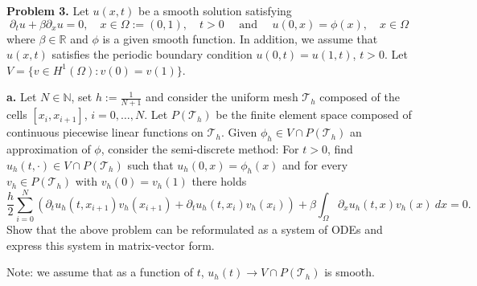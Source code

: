 \documentclass[11pt]{article}
\begin{document}
\vskip 2cm




\textbf{Problem 3.} Let $u(x,t)$ be a smooth solution satisfying
\begin{equation}
    \partial_t u + \beta \partial_x u = 0, \quad x \in \Omega := (0,1), \quad t > 0 \quad \text{ and } \quad u(0,x) = \phi(x), \quad x\in \Omega
\end{equation}
where $\beta \in \mathbb{R}$ and $\phi$ is a given smooth function.
In addition, we assume that $u(x,t)$ satisfies the periodic boundary condition $u(0,t) = u(1,t)$, $t > 0$. 
Let $V = \{ v \in H^1(\Omega) : v(0) = v(1) \}$.


\vskip 1cm


\textbf{a.} Let $N\in \mathbb{N}$, set $h := \frac{1}{N+1}$ and consider the uniform mesh $\mathcal{T}_h$ composed of the cells $[x_i,x_{i+1}]$, $i= 0,\ldots,N$.
Let $P(\mathcal{T}_h)$ be the finite element space composed of continuous piecewise linear functions on $\mathcal{T}_h$.
Given $\phi_h \in V \cap P(\mathcal{T}_h)$ an approximation of $\phi$, consider the semi-discrete method: For $t >0$, find $u_h(t, \cdot) \in V \cap P(\mathcal{T}_h)$ such that $u_h(0,x) = \phi_h(x)$ and for every $v_h \in  P(\mathcal{T}_h)$ with $v_h(0) = v_h(1)$ there holds 
\begin{equation} \label{pb3:equation}
    \frac{h}{2} \sum_{i=0}^N (\partial_t u_h (t, x_{i+1}) v_h(x_{i+1}) + \partial_t u_h(t, x_i) v_h(x_i)) + \beta \int_\Omega \partial_x u_h(t,x) v_h(x) \: dx = 0.
\end{equation}
Show that the above problem can be reformulated as a system of ODEs and express this system in matrix-vector form. 

Note: we assume that as a function of $t$, $u_h(t) \to V \cap P(\mathcal{T}_h)$ is smooth.

\vskip 1cm
\end{document}

